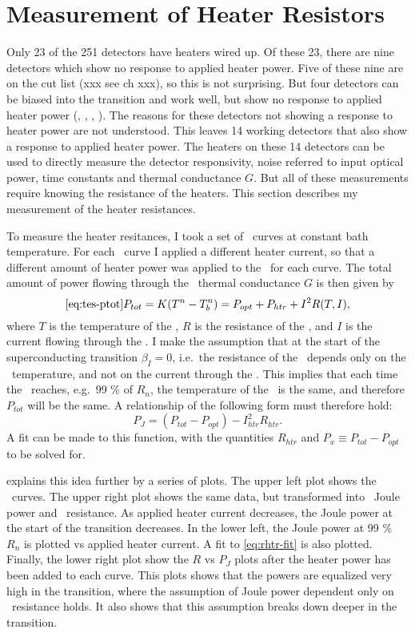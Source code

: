 \section{Measurement of Heater Resistors}

Only 23 of the 251 detectors have heaters wired up.
Of these 23, there are nine detectors which show no response to applied heater power.
Five of these nine are on the cut list (xxx see ch xxx), so this is not surprising.
But four detectors can be biased into the transition and work well, but show no response to applied heater power (, , , ).
The reasons for these detectors not showing a response to heater power are not understood.
This leaves 14 working detectors that also show a response to applied heater power.
The heaters on these 14 detectors can be used to directly measure the detector responsivity, noise referred to input optical power, time constants and thermal conductance $G$.
But all of these measurements require knowing the resistance of the heaters.
This section describes my measurement of the heater resistances.

To measure the heater resitances, I took a set of \IV\ curves at constant bath temperature.
For each \IV\ curve I applied a different heater current, so that a different amount of heater power was applied to the \TES\ for each curve.
The total amount of power flowing through the \TES\ thermal conductance $G$ is then given by
\begin{equation}\ref{eq:tes-ptot}
P_{tot} = K(T^n - T_b^n) = P_{opt} + P_{htr} + I^2 R(T,I),
\end{equation}
where $T$ is the temperature of the \TES, $R$ is the resistance of the \TES, and $I$ is the current flowing through the \TES.
I make the assumption that at the start of the superconducting transition $\beta_I = 0$, i.e.\ the resistance of the \TES\ depends only on the \TES\ temperature, and not on the current through the \TES.
This implies that each time the \TES\ reaches, e.g.\ 99 \% of $R_n$, the temperature of the \TES\ is the same, and therefore $P_{tot}$ will be the same.
A relationship of the following form must therefore hold:
\begin{equation}\label{eq:rhtr-fit}
P_{J} = (P_{tot} - P_{opt}) - I_{htr}^2 R_{htr}.
\end{equation}
A fit can be made to this function, with the quantities $R_{htr}$ and $P_{x} \equiv P_{tot} - P_{opt}$ to be solved for.

 explains this idea further by a series of plots.
The upper left plot shows the \TES\ \IV curves.
The upper right plot shows the same data, but transformed into \TES\ Joule power and \TES\ resistance.
As applied heater current decreases, the Joule power at the start of the transition decreases.
In the lower left, the Joule power at 99 \% $R_{n}$ is plotted vs applied heater current.
A fit to \eqref{eq:rhtr-fit} is also plotted.
Finally, the lower right plot show the $R$ vs $P_J$ plots after the heater power has been added to each curve.
This plots shows that the powers are equalized very high in the transition, where the assumption of Joule power dependent only on \TES\ resistance holds.
It also shows that this assumption breaks down deeper in the transition.

